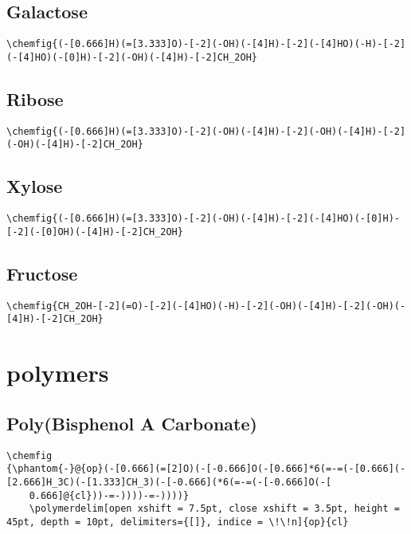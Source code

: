 \section{Galactose}\label{app:galactose}
\begin{lstlisting}
\chemfig{(-[0.666]H)(=[3.333]O)-[-2](-OH)(-[4]H)-[-2](-[4]HO)(-H)-[-2](-[4]HO)(-[0]H)-[-2](-OH)(-[4]H)-[-2]CH_2OH}
\end{lstlisting}

\section{Ribose}\label{app:ribose}
\begin{lstlisting}
\chemfig{(-[0.666]H)(=[3.333]O)-[-2](-OH)(-[4]H)-[-2](-OH)(-[4]H)-[-2](-OH)(-[4]H)-[-2]CH_2OH}
\end{lstlisting}

\section{Xylose}\label{app:xylose}
\begin{lstlisting}
\chemfig{(-[0.666]H)(=[3.333]O)-[-2](-OH)(-[4]H)-[-2](-[4]HO)(-[0]H)-[-2](-[0]OH)(-[4]H)-[-2]CH_2OH}
\end{lstlisting}

\section{Fructose}\label{app:fructose}
\begin{lstlisting}
\chemfig{CH_2OH-[-2](=O)-[-2](-[4]HO)(-H)-[-2](-OH)(-[4]H)-[-2](-OH)(-[4]H)-[-2]CH_2OH}
\end{lstlisting}



\chapter{polymers}\label{app:polymers}


\section{Poly(Bisphenol A Carbonate)}\label{app:poly(bisphenol-a-carbonate)}
\begin{lstlisting}
\chemfig
{\phantom{-}@{op}(-[0.666](=[2]O)(-[-0.666]O(-[0.666]*6(=-=(-[0.666](-[2.666]H_3C)(-[1.333]CH_3)(-[-0.666](*6(=-=(-[-0.666]O(-[
    0.666]@{cl}))-=-))))-=-))))}
    \polymerdelim[open xshift = 7.5pt, close xshift = 3.5pt, height = 45pt, depth = 10pt, delimiters={[]}, indice = \!\!n]{op}{cl}
\end{lstlisting}


